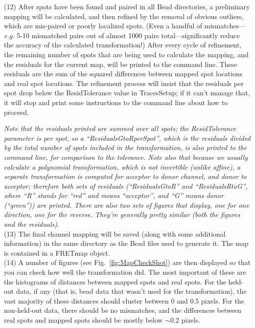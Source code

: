\documentclass[11pt]{article}
\begin{document}
\noindent (12) After spots have been found and paired in all Bead directories, a preliminary mapping will be calculated, and then refined by the removal of obvious outliers, which are mis-paired or poorly localized spots.  (Even a handful of mismatches---{\it e.g.} 5-10 mismatched pairs out of almost 1000 pairs total---significantly reduce the accuracy of the calculated transformation!)  After every cycle of refinement, the remaining number of spots that are being used to calculate the mapping, and the residuals for the current map, will be printed to the command line.  These residuals are the sum of the squared differences between mapped spot locations and real spot locations.  The refinement process will insist that the residuals per spot drop below the ResidTolerance value in TracesSetup; if it can't manage that, it will stop %
and print some instructions to the command line about how to proceed.

{\it Note that the residuals printed are summed over all spots; the ResidTolerance parameter is per spot, so a ``ResidualsGtoRperSpot'', which is the residuals divided by the total number of spots included in the transformation, is also printed to the command line, for comparison to the tolerance.  Note also that because we usually calculate a polynomial transformation, which is not invertible (unlike affine), a separate transformation is computed for acceptor to donor channel, and donor to acceptor; therefore both sets of residuals (``ResidualsGtoR'' and ``ResidualsRtoG'', where ``R'' stands for ``red'' and means ``acceptor'', and ``G'' means donor (``green'')) are printed.  There are also two sets of figures that display, one for one direction, one for the reverse.  They're generally pretty similar (both the figures and the residuals).}\\

\noindent (13) The final channel mapping will be saved (along with some additional information) in the same directory as the Bead files used to generate it. The map is contained in a FRETmap object.  \\

\noindent (14) A number of figures (see Fig.~\ref{fig:MapCheckShot}) are then displayed so that you can check how well the transformation did.  The most important of these are the histograms of distances between mapped spots and real spots. For the held-out data, if any (that is, bead data that wasn't used for the transformation), the vast majority of these distances should cluster between 0 and 0.5 pixels.  %
For the non-held-out data, there should be no mismatches, and the differences between real spots and mapped spots should be mostly below $\sim$0.2 pixels.  \\
\end{document}

